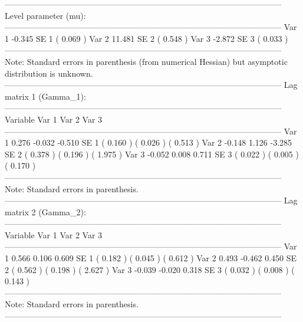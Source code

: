 \documentclass[article]{jss}
\begin{document}
\begin{CodeChunk}
\begin{CodeOutput}
-----------------------------------------------------------------------------------------------------
    Level parameter (mu):                                                                         
-----------------------------------------------------------------------------------------------------
        Var 1            -0.345     
         SE 1         (   0.069  )  
        Var 2            11.481     
         SE 2         (   0.548  )  
        Var 3            -2.872     
         SE 3         (   0.033  )  
-----------------------------------------------------------------------------------------------------
Note: Standard errors in parenthesis (from numerical Hessian) but asymptotic distribution is unknown. 
-----------------------------------------------------------------------------------------------------
    Lag matrix 1 (Gamma_1):                                                                            
-----------------------------------------------------------------------------------------------------
      Variable         Var 1          Var 2          Var 3   
-----------------------------------------------------------------------------------------------------
      Var 1            0.276         -0.032         -0.510    
       SE 1        (   0.160  )   (   0.026  )   (   0.513  )  
      Var 2           -0.148          1.126         -3.285    
       SE 2        (   0.378  )   (   0.196  )   (   1.975  )  
      Var 3           -0.052          0.008          0.711    
       SE 3        (   0.022  )   (   0.005  )   (   0.170  )  
-----------------------------------------------------------------------------------------------------
Note: Standard errors in parenthesis.                                                                
-----------------------------------------------------------------------------------------------------
    Lag matrix 2 (Gamma_2):                                                                            
-----------------------------------------------------------------------------------------------------
      Variable         Var 1          Var 2          Var 3   
-----------------------------------------------------------------------------------------------------
      Var 1            0.566          0.106          0.609    
       SE 1        (   0.182  )   (   0.045  )   (   0.612  )  
      Var 2            0.493         -0.462          0.450    
       SE 2        (   0.562  )   (   0.198  )   (   2.627  )  
      Var 3           -0.039         -0.020          0.318    
       SE 3        (   0.032  )   (   0.008  )   (   0.143  )  
-----------------------------------------------------------------------------------------------------
Note: Standard errors in parenthesis.                                                                
-----------------------------------------------------------------------------------------------------


\end{CodeOutput}
\end{CodeChunk}
\end{document}
